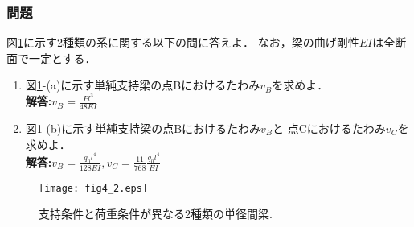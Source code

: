 \documentclass[10pt,a4j]{jarticle}
\begin{document}
\subsubsection{問題}
図\ref{fig:fig2_4}に示す2種類の系に関する以下の問に答えよ．
なお，梁の曲げ剛性$EI$は全断面で一定とする．
\begin{enumerate}
\item
	図\ref{fig:fig2_4}-(a)に示す単純支持梁の点Bにおけるたわみ$v_B$を求めよ．\\
	{\bf 解答:}$v_B=\frac{Pl^3}{48EI}$
\item
	図\ref{fig:fig2_4}-(b)に示す単純支持梁の点Bにおけるたわみ$v_B$と
	点Cにおけるたわみ$v_C$を求めよ．\\
	{\bf 解答:}$v_B=\frac{q_0l^4}{128EI}, v_C=\frac{11}{768}\frac{q_0l^4}{EI}$
\end{enumerate}
\begin{figure}[h]
	\begin{center}
	\texttt{[image: fig4\_2.eps]} 
	\end{center}
	\caption{支持条件と荷重条件が異なる2種類の単径間梁.} 
	\label{fig:fig2_4}
\end{figure}
\end{document}
